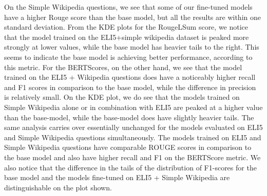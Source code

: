 \documentclass[11pt, oneside]{article}   	%
\begin{document}
On the Simple Wikipedia questions, we see that some of our fine-tuned models have a higher Rouge score than the base model, but all the results are within one standard deviation.
From the KDE plots for the RougeLSum score, we notice that the model trained on the ELI5+simple wikipedia dataset is peaked more strongly at lower values, while the base model has heavier tails to the right. 
This seems to indicate the base model is achieving better performance, according to this metric.
For the BERTScores, on the other hand, we see that the model trained on the ELI5 + Wikipedia questions does have a noticeably higher recall and F1 scores in comparison to the base model, while the difference in precision is relatively small.
On the KDE plot, we do see that the models trained on Simple Wikipedia alone or in combination with ELI5 are peaked at a higher value than the base-model, while the base-model does have slightly heavier tails.
The same analysis carries over essentially unchanged for the models evaluated on ELI5 and Simple Wikipedia questions simultaneously.
The models trained on ELI5 and Simple Wikipedia questions have comparable ROUGE scores in comparison to the base model and also have higher recall and F1 on the BERTScore metric.
We also notice that the difference in the tails of the distribution of F1-scores for the base model and the models fine-tuned on ELI5 + Simple Wikipedia are distinguishable on the plot shown. 
\end{document}
